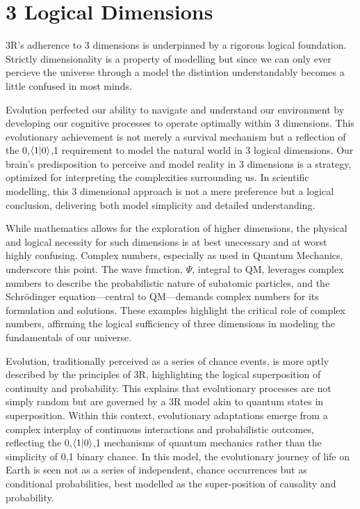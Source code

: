 \documentclass[12pt]{article}
\begin{document}
\section*{3 Logical Dimensions}
3R's adherence to 3 dimensions is underpinned by a rigorous logical foundation. Strictly dimensionality is a property of modelling but since we can only ever percieve the universe through a model the distintion understandably becomes a little confused in most minds.

Evolution perfected our ability to navigate and understand our environment by developing our cognitive processes to operate optimally within 3 dimensions. This evolutionary achievement is not merely a survival mechanism but a reflection of the {0,\(\langle 1 | 0 \rangle\),1} requirement to model the natural world in 3 logical dimensions. Our brain's predisposition to perceive and model reality in 3 dimensions is a strategy, optimized for interpreting the complexities surrounding us. In scientific modelling, this 3 dimensional approach is not a mere preference but a logical conclusion, delivering both model simplicity and detailed understanding.

While mathematics allows for the exploration of higher dimensions, the physical and logical necessity for such dimensions is at best unecessary and at worst highly confusing. Complex numbers, especially as used in Quantum Mechanics, underscore this point. The wave function, \(\Psi\), integral to QM, leverages complex numbers to describe the probabilistic nature of subatomic particles, and the Schrödinger equation—central to QM—demands complex numbers for its formulation and solutions. These examples highlight the critical role of complex numbers, affirming the logical sufficiency of three dimensions in modeling the fundamentals of our universe.

Evolution, traditionally perceived as a series of chance events, is more aptly described by the principles of 3R, highlighting the logical superposition of continuity and probability. This explains that evolutionary processes are not simply random but are governed by a 3R model akin to quantum states in superposition. Within this context, evolutionary adaptations emerge from a complex interplay of continuous interactions and probabilistic outcomes, reflecting the {0,\(\langle 1 | 0 \rangle\),1} mechanisms of quantum mechanics rather than the simplicity of {0,1} binary chance. In this model, the evolutionary journey of life on Earth is seen not as a series of independent, chance occurrences but as conditional probabilities, best modelled as the super-position of causality and probability.
\end{document}
